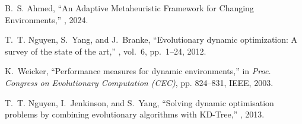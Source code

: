 \documentclass[10pt]{article}
\begin{document}
\begin{thebibliography}{99}

B.~S. Ahmed,
\newblock ``An Adaptive Metaheuristic Framework for Changing Environments,''
, 2024.

T.~T. Nguyen, S.~Yang, and J.~Branke,
\newblock ``Evolutionary dynamic optimization: A survey of the state of the art,''
, vol.~6, pp.~1--24, 2012.

K.~Weicker,
\newblock ``Performance measures for dynamic environments,''
\newblock in {\em Proc. Congress on Evolutionary Computation (CEC)}, pp. 824--831, IEEE, 2003.

T.~T. Nguyen, I.~Jenkinson, and S.~Yang,
\newblock ``Solving dynamic optimisation problems by combining evolutionary algorithms with KD-Tree,''
, 2013.

\end{thebibliography}
\end{document}
